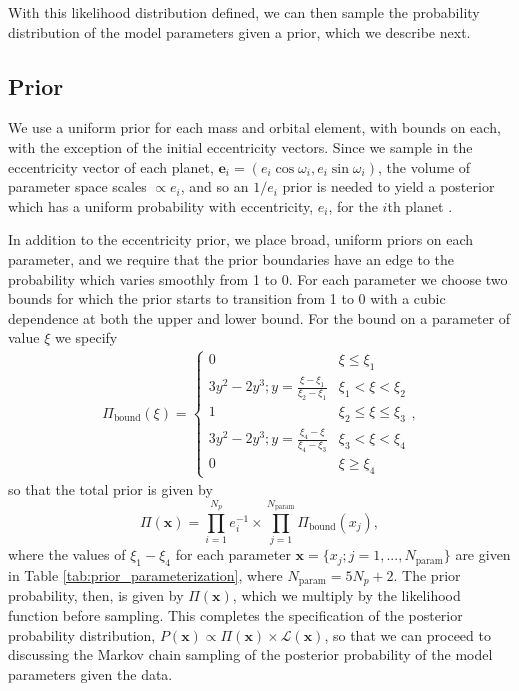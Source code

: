 \documentclass[fleqn,usenatbib]{mnras} %
\begin{document}
With this likelihood distribution
defined, we can then sample the probability distribution of
the model parameters given a prior, which we describe next.

\subsection{Prior}

We use a uniform prior for each mass and orbital element,
with bounds on each, with the exception of the initial eccentricity vectors.
Since we sample in the eccentricity vector of each planet, $\mathbf{e}_i = (e_i\cos{\omega_i},e_i\sin{\omega_i})$, the volume
of parameter space scales $\propto e_i$, and so an $1/e_i$ prior is needed to
yield a posterior which has a uniform probability with eccentricity, $e_i$,
for the $i$th planet
\citep{Eastman2013}.  

In addition to the eccentricity prior, we place broad, uniform priors on each parameter, and we require that
the prior boundaries have an edge to the probability which varies smoothly from 1 to 0.  For each parameter 
we choose two bounds for which the prior starts to transition from 1 to 0 with a cubic dependence at both
the upper and lower bound.  For the  bound on a parameter of value $\xi$ we specify
\begin{eqnarray}
\Pi_\mathrm{bound}(\xi) = 
\begin{cases}
0 &  \xi {\le} \xi_1\\
3y^2-2y^3; y = \frac{\xi-\xi_1}{\xi_2-\xi_1} & \xi_1 {<} \xi {<} \xi_2\\
1 & \xi_2 {\le} \xi {\le} \xi_3 \\
3y^2-2y^3; y = \frac{\xi_4-\xi}{\xi_4-\xi_3} & \xi_3{<} \xi {<} \xi_4\\
0 &  \xi {\ge} \xi_4
\end{cases},
\end{eqnarray}
so that the total prior is given by
\begin{equation}
    \Pi(\mathbf{x}) = \prod_{i=1}^{N_p} e_i^{-1} {\times} \prod_{j=1}^{N_\mathrm{param}} \Pi_\mathrm{bound}(x_j),
\end{equation}
where the values of $\xi_1{-}\xi_4$ for each parameter
$\mathbf{x} {=} \{x_j; j{=} 1,...,N_\mathrm{param}\}$ are given in Table
\ref{tab:prior_parameterization}, where $N_\mathrm{param} = 5 N_p + 2$.
The prior probability, then, is given by $\Pi(\mathbf{x})$, which we
multiply by the likelihood function before sampling.
This completes the specification of the posterior probability distribution, $P(\mathbf{x}) \propto \Pi(\mathbf{x}) \times \mathcal{L}(\mathbf{x})$,
so that we can proceed to discussing the Markov chain sampling of the posterior probability of the model parameters given the data.
\end{document}
